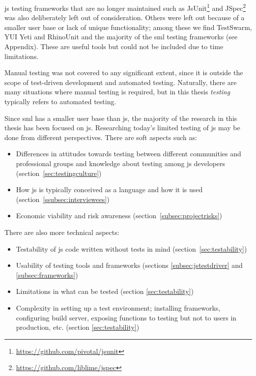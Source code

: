 \documentclass[11pt]{article}
\begin{document}
\gls{js} testing frameworks that are no longer maintained such as JsUnit\footnote{\url{https://github.com/pivotal/jsunit}} and JSpec\footnote{\url{https://github.com/liblime/jspec}} was also deliberately left out of consideration. Others were left out because of a smaller user base or lack of unique functionality; among these we find TestSwarm, YUI Yeti and RhinoUnit and the majority of the \gls{sml} testing frameworks (see Appendix). These are useful tools but could not be included due to time limitations.

Manual testing was not covered to any significant extent, since it is outside the scope of test-driven development and automated testing. Naturally, there are many situations where manual testing is required, but in this thesis \emph{testing} typically refers to automated testing.

Since \gls{sml} has a smaller user base than \gls{js}, the majority of the research in this thesis has been focused on \gls{js}. Researching today's limited testing of \gls{js} may be done from different perspectives. There are soft aspects such as:
\begin{itemize}[label={--}]
\item Differences in attitudes towards testing between different communities and professional groups and knowledge about testing among \gls{js} developers (section~\ref{sec:testingculture})
\item How \gls{js} is typically conceived as a language and how it is used (section~\ref{ssubsec:interviewees})
\item Economic viability and risk awareness (section~\ref{subsec:projectrisks})
\end{itemize}

There are also more technical aspects:
\begin{itemize}[label={--}]
\item Testability of \gls{js} code written without tests in mind (section~\ref{sec:testability})
\item Usability of testing tools and frameworks (sections \ref{subsec:jstestdriver} and \ref{subsec:frameworks})
\item Limitations in what can be tested (section \ref{sec:testability})
\item Complexity in setting up a test environment; installing frameworks, configuring build server, exposing functions to testing but not to users in production, etc. (section \ref{sec:testability})
\end{itemize}
\end{document}
